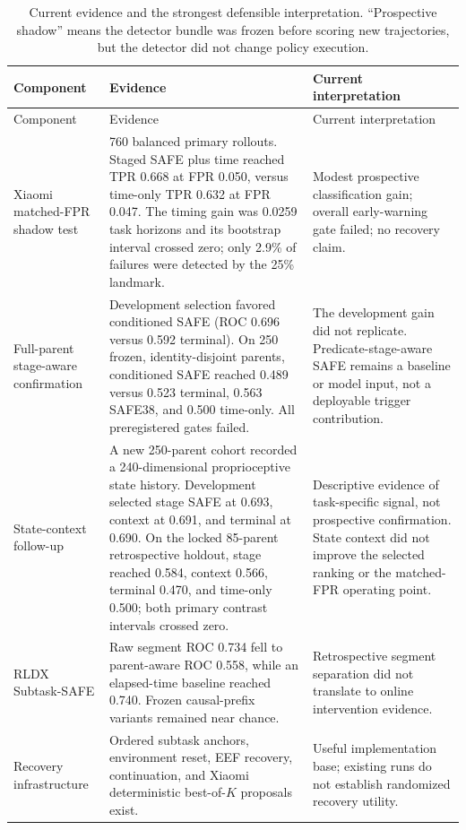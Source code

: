 \begingroup
\small
\begin{longtable}{P{0.22\textwidth}P{0.36\textwidth}P{0.32\textwidth}}
\caption{Current evidence and the strongest defensible interpretation. ``Prospective shadow'' means the detector bundle was frozen before scoring new trajectories, but the detector did not change policy execution.}
\label{tab:starting-evidence}\\
\toprule
Component & Evidence & Current interpretation \\
\midrule
\endfirsthead
\toprule
Component & Evidence & Current interpretation \\
\midrule
\endhead
Xiaomi matched-FPR shadow test & 760 balanced primary rollouts. Staged SAFE plus time reached TPR 0.668 at FPR 0.050, versus time-only TPR 0.632 at FPR 0.047. The timing gain was 0.0259 task horizons and its bootstrap interval crossed zero; only 2.9\% of failures were detected by the 25\% landmark. & Modest prospective classification gain; overall early-warning gate failed; no recovery claim. \\
Full-parent stage-aware confirmation & Development selection favored conditioned SAFE (ROC 0.696 versus 0.592 terminal). On 250 frozen, identity-disjoint parents, conditioned SAFE reached 0.489 versus 0.523 terminal, 0.563 SAFE38, and 0.500 time-only. All preregistered gates failed. & The development gain did not replicate. Predicate-stage-aware SAFE remains a baseline or model input, not a deployable trigger contribution. \\
State-context follow-up & A new 250-parent cohort recorded a 240-dimensional proprioceptive state history. Development selected stage SAFE at 0.693, context at 0.691, and terminal at 0.690. On the locked 85-parent retrospective holdout, stage reached 0.584, context 0.566, terminal 0.470, and time-only 0.500; both primary contrast intervals crossed zero. & Descriptive evidence of task-specific signal, not prospective confirmation. State context did not improve the selected ranking or the matched-FPR operating point. \\
RLDX Subtask-SAFE & Raw segment ROC 0.734 fell to parent-aware ROC 0.558, while an elapsed-time baseline reached 0.740. Frozen causal-prefix variants remained near chance. & Retrospective segment separation did not translate to online intervention evidence. \\
Recovery infrastructure & Ordered subtask anchors, environment reset, EEF recovery, continuation, and Xiaomi deterministic best-of-$K$ proposals exist. & Useful implementation base; existing runs do not establish randomized recovery utility. \\

\end{longtable}
